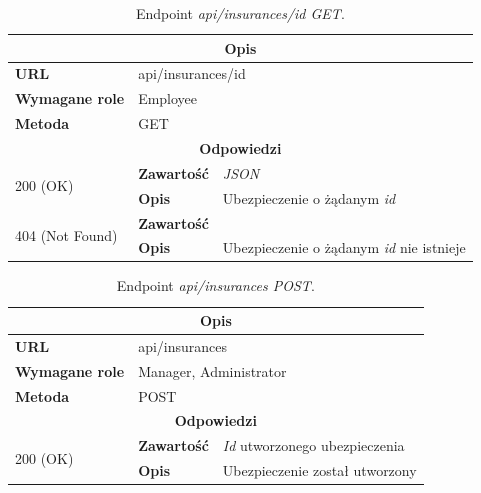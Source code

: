 \documentclass[eng,printmode,openany]{mgr}
\begin{document}
\begin{table}[H]
	\caption{Endpoint \textit{api/insurances/id GET}.}
	\begin{tabularx}{\textwidth}{|l|l|X|}
		\hline
		\multicolumn{3}{|c|}{\textbf{\textbf{Opis}}}
		\\ \hline
		\textbf{URL}                         & \multicolumn{2}{l|}{api/insurances/id}
		\\ \hline
		\textbf{Wymagane role}               & \multicolumn{2}{l|}{Employee}
		\\ \hline
		\textbf{Metoda}                      & \multicolumn{2}{l|}{GET}
		\\ \hline
		\multicolumn{3}{|c|}{\textbf{Odpowiedzi}}
		\\ \hline
		\multirow{2}{*}{200 (OK)} 	        & \textbf{Zawartość}   	& \textit{JSON}
		\\ \cline{2-3}                      & \textbf{Opis}         	& Ubezpieczenie o żądanym \textit{id}
		\\ \hline
		\multirow{2}{*}{404 (Not Found)} 	& \textbf{Zawartość}     & 
		\\ \cline{2-3}                      & \textbf{Opis}          & Ubezpieczenie o żądanym \textit{id} nie istnieje
		\\ \hline
	\end{tabularx}
\end{table}

\begin{table}[H]
	\caption{Endpoint \textit{api/insurances POST}.}
	\begin{tabularx}{\textwidth}{|l|l|X|}
		\hline
		\multicolumn{3}{|c|}{\textbf{\textbf{Opis}}}
		\\ \hline
		\textbf{URL}                       & \multicolumn{2}{l|}{api/insurances}
		\\ \hline
		\textbf{Wymagane role}             & \multicolumn{2}{l|}{Manager, Administrator}
		\\ \hline
		\textbf{Metoda}                    & \multicolumn{2}{l|}{POST}
		\\ \hline
		\multicolumn{3}{|c|}{\textbf{Odpowiedzi}}
		\\ \hline
		\multirow{2}{*}{200 (OK)} 		& \textbf{Zawartość}     & \textit{Id} utworzonego ubezpieczenia
		\\ \cline{2-3}                  & \textbf{Opis}         	& Ubezpieczenie został utworzony
		\\ \hline
	\end{tabularx}
\end{table}
\end{document}
